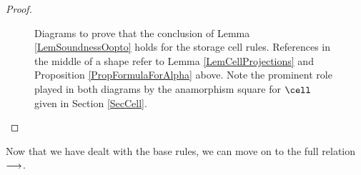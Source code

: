 \begin{proof}
\begin{itemize}
\begin{figure}[htbp]
\begin{mathpar}
        \end{mathpar}
        \caption[Diagrams to prove that the conclusion of Lemma \ref{LemSoundnessOopto} holds for the storage cell rules.]{Diagrams to prove that the conclusion of Lemma \ref{LemSoundnessOopto} holds for the storage cell rules.  
        References in the middle of a shape refer to Lemma \ref{LemCellProjections} and Proposition \ref{PropFormulaForAlpha} above.  
        Note the prominent role played in both diagrams by the anamorphism square for $\cell$ given in Section \ref{SecCell}.}
        \label{FigSoundnessOoptoStorage}
      \end{figure}
  \end{itemize}
\end{proof}

Now that we have dealt with the base rules, we can move on to the full relation $\opto$.

